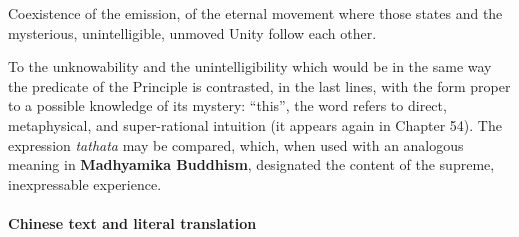 Coexistence of the emission, of the eternal movement where those states and the mysterious, unintelligible, unmoved Unity follow each other.

To the unknowability and the unintelligibility which would be in the same way the predicate of the Principle is contrasted, in the last lines, with the form proper to a possible knowledge of its mystery: ``this'', the word refers to direct, metaphysical, and super-rational intuition (it appears again in Chapter 54). The expression \emph{tathata} may be compared, which, when used with an analogous meaning in \textbf{Madhyamika Buddhism}, designated the content of the supreme, inexpressable experience.

\paragraph{Chinese text and literal translation}


